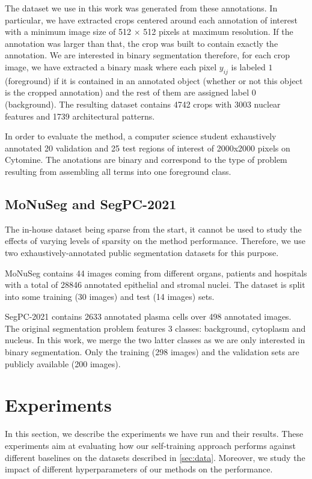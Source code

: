 The dataset we use in this work was generated from these annotations. In particular, we have extracted crops centered around each annotation of interest with a minimum image size of 512 $\times$ 512 pixels at maximum resolution. If the annotation was larger than that, the crop was built to contain exactly the annotation. We are interested in binary segmentation therefore, for each crop image, we have extracted a binary mask where each pixel $y_{ij}$ is labeled $1$ (foreground) if it is contained in an annotated object (whether or not this object is the cropped annotation) and the rest of them are assigned label $0$ (background). The resulting dataset contains 4742 crops with 3003 nuclear features and 1739 architectural patterns. 

In order to evaluate the method, a computer science student exhaustively annotated 20 validation and 25 test regions of interest of 2000x2000 pixels on Cytomine. The anotations are binary and correspond to the type of problem resulting from assembling all terms into one foreground class. 

\subsection{MoNuSeg and SegPC-2021}
\label{ssec:datapublicdatasets}
The in-house dataset being sparse from the start, it cannot be used to study the effects of varying levels of sparsity on the method performance. Therefore, we use two exhaustively-annotated public segmentation datasets for this purpose. 

MoNuSeg \cite{kumar2019multi} contains 44 images coming from different organs, patients and hospitals with a total of 28846 annotated epithelial and stromal nuclei. The dataset is split into some training (30 images) and test (14 images) sets.

SegPC-2021 \cite{gupta2021segpc} contains 2633 annotated plasma cells over 498 annotated images. The original segmentation problem features 3 classes: background, cytoplasm and nucleus. In this work, we merge the two latter classes as we are only interested in binary segmentation. Only the training (298 images) and the validation sets are publicly available (200 images).

\section{Experiments}
\label{sec:experiments}

In this section, we describe the experiments we have run and their results. These experiments aim at evaluating how our self-training approach performs against different baselines on the datasets described in \cref{sec:data}. Moreover, we study the impact of different hyperparameters of our methods on the performance.

